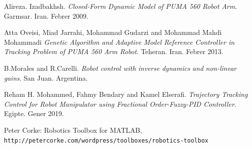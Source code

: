 \documentclass[]{article}
\begin{document}
\begin{thebibliography}{5}
Alireza. Izadbakhsh. \textit{Closed-Form Dynamic Model of  PUMA 560 Robot Arm}.
Garmsar. Iran. Febrer 2009.

Atta Oveisi, Miad Jarrahi, Mohammad Gudarzi and Mohammad Mahdi Mohammadi  \textit{Genetic Algorithm and Adaptive Model Reference Controller in Tracking Problem of PUMA 560 Arm Robot}.
Teheran. Iran. Febrer 2013.

B.Morales and R.Carelli. \textit{Robot control with inverse dynamics and non-linear gains}.
San Juan. Argentina.

Reham H. Mohammed, Fahmy Bendary and Kamel Elserafi. \textit{Trajectory Tracking Control for Robot Manipulator using Fractional Order-Fuzzy-PID Controller}.
Egipte. Gener 2019.

Peter Corke: Robotics Toolbox for MATLAB,
\\\texttt{http://petercorke.com/wordpress/toolboxes/robotics-toolbox}
\end{thebibliography}
\end{document}
